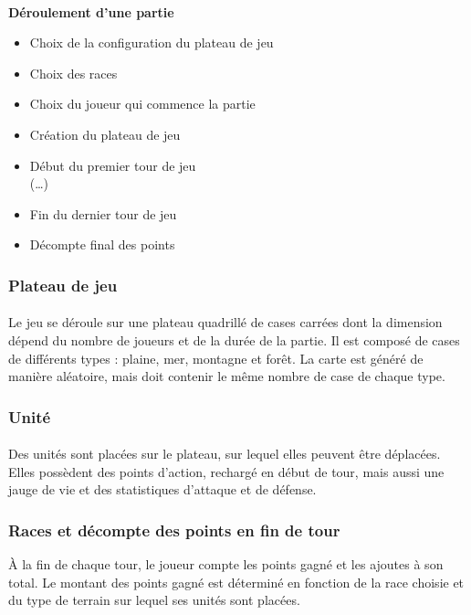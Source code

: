 \documentclass[a4paper]{article}
\begin{document}
\paragraph{}
\textbf{Déroulement d'une partie}
\begin{itemize}
    \item Choix de la configuration du plateau de jeu
    \item Choix des races
    \item Choix du joueur qui commence la partie
    \item Création du plateau de jeu
    \item Début du premier tour de jeu\\(\dots)
    \item Fin du dernier tour de jeu
    \item Décompte final des points
\end{itemize}

\subsubsection{Plateau de jeu}
\paragraph{}
Le jeu se déroule sur une plateau quadrillé de cases carrées dont la dimension dépend du nombre de joueurs et de la durée de la partie.\label{map_gen} Il est composé de cases de différents types : plaine, mer, montagne et forêt. La carte est généré de manière aléatoire, mais doit contenir le même nombre de case de chaque type.

\subsubsection{Unité}
\paragraph{}
Des unités sont placées sur le plateau, sur lequel elles peuvent être déplacées. Elles possèdent des points d'action, rechargé en début de tour, mais aussi une jauge de vie et des statistiques d'attaque et de défense.

\subsubsection{Races et décompte des points en fin de tour}
À la fin de chaque tour, le joueur compte les points gagné et les ajoutes à son total. Le montant des points gagné est déterminé en fonction de la race choisie et du type de terrain sur lequel ses unités sont placées.
\end{document}
